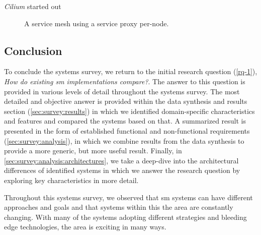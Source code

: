\textit{Cilium} started out 
\begin{figure}[!t]
    \centering
    
    
    \caption{A service mesh using a service proxy per-node.}
    \label{fig:sm-arch-ebpf}
\end{figure}


\subsection{Conclusion}
\label{sec:survey:analysis:conclusion}

To conclude the systems survey, we return to the initial research question (\ref{rq-1}), \textit{How do existing \gls{sm} implementations compare?}. The answer to this question is provided in various levels of detail throughout the systems survey. The most detailed and objective answer is provided  within the data synthesis and results section (\cref{sec:survey:results}) in which we identified domain-specific characteristics and features and compared the systems based on that. A summarized result is presented in the form of established functional and non-functional requirements (\cref{sec:survey:analysis}), in which we combine results from the data synthesis to provide a more generic, but more useful result. Finally, in \cref{sec:survey:analysis:architectures}, we take a deep-dive into the architectural differences of identified systems in which we answer the research question by exploring key characteristics in more detail.

Throughout this systems survey, we observed that \gls{sm} systems can have different approaches and goals and that systems within this the area are constantly changing. With many of the systems adopting different strategies and bleeding edge technologies, the area is exciting in many ways. 
